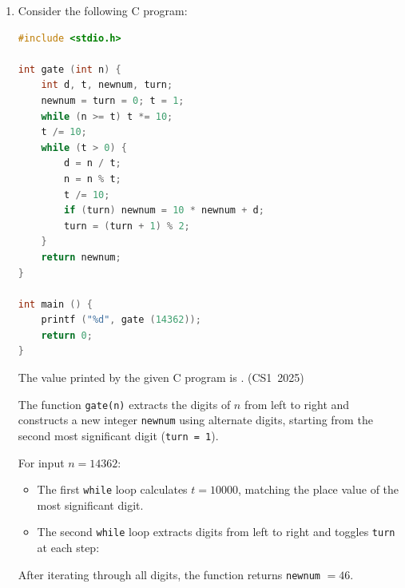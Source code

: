 \begin{enumerate}[label=\thesubsection.\arabic*, ref=\thesubsection.\theenumi]
\vspace{0.2cm}
\solution
The code deletes every element in L1 (from $2^{\text{nd}}$ node onward) that appears in L2. Elements $12, 9, 11, 15$ are deleted from L1. Retained elements are $[1, 7, 3, 5, 8]$, leaving 5 nodes in total.

The following code can verify the solution:
\begin{lstlisting}[frame=single, basicstyle=\rmfamily, escapeinside={(*@}{@*)}]
(*@\makebox[\dimexpr\linewidth-2\fboxsep-2\fboxrule\relax][c]{codes/q25.c}@*)
\end{lstlisting}

\vspace{0.5cm}
\item Consider the following C program:
\begin{lstlisting}[language=C]
#include <stdio.h>

int gate (int n) {
    int d, t, newnum, turn;
    newnum = turn = 0; t = 1;
    while (n >= t) t *= 10;
    t /= 10;
    while (t > 0) {
        d = n / t;
        n = n % t;
        t /= 10;
        if (turn) newnum = 10 * newnum + d;
        turn = (turn + 1) % 2;
    }
    return newnum;
}

int main () {
    printf ("%d", gate (14362));
    return 0;
}
\end{lstlisting}
The value printed by the given C program is \underline{\hspace{1cm}}.
\hfill (CS1~2025)

\vspace{0.2cm}
\solution
The function \texttt{gate(n)} extracts the digits of $n$ from left to right and constructs a new integer \texttt{newnum} using alternate digits, starting from the second most significant digit (\texttt{turn = 1}).

For input $n = 14362$:
\begin{itemize}
    \item The first \texttt{while} loop calculates $t = 10000$, matching the place value of the most significant digit.
    \item The second \texttt{while} loop extracts digits from left to right and toggles \texttt{turn} at each step:
\end{itemize}

\begin{center}

\end{center}

After iterating through all digits, the function returns \texttt{newnum} $= 46$.


\end{enumerate}
